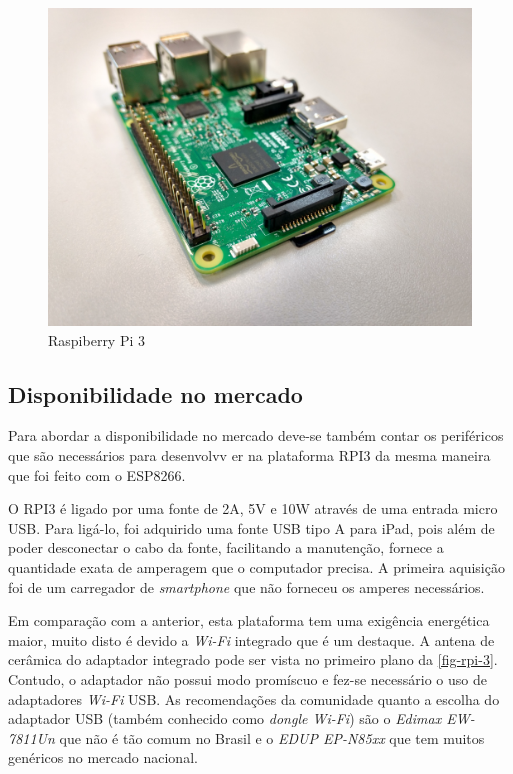 \begin{figure}[htb]
	\caption{\label{fig-rpi-3}Raspiberry Pi 3 }
	\begin{center}
		\includegraphics[width=1\textwidth]{040-plataformas/RPi-WiFi-dongles/rpi-onboard.jpg}
	\end{center}
\end{figure}



\subsection{Disponibilidade no mercado}
\label{subsec:mercado-rpi}

Para abordar a disponibilidade no mercado deve-se também contar os periféricos
que são necessários para desenvolvv er na plataforma  RPI3 da mesma maneira que
foi feito com o ESP8266.

O RPI3 é ligado por uma fonte de 2A, 5V e 10W através de uma entrada micro
USB. Para ligá-lo, foi adquirido uma fonte USB tipo A para iPad, pois além de
poder desconectar o cabo da fonte, facilitando a manutenção, fornece a
quantidade exata de amperagem que o computador precisa. A primeira aquisição foi
de um carregador de \emph{smartphone} que não forneceu os amperes necessários.

Em comparação com a anterior, esta plataforma tem uma exigência energética maior,
muito disto é devido a \emph{Wi-Fi} integrado que é um destaque.
A antena de cerâmica do adaptador integrado pode ser vista no primeiro plano da
\autoref{fig-rpi-3}. Contudo, o adaptador não possui modo promíscuo e fez-se
necessário o uso de adaptadores \emph{Wi-Fi} USB. As recomendações da comunidade
quanto a escolha do adaptador USB (também conhecido como \emph{dongle Wi-Fi})
são o \emph{Edimax EW-7811Un} que não é tão comum no Brasil e o
\emph{EDUP EP-N85xx} que tem muitos genéricos no mercado nacional.

